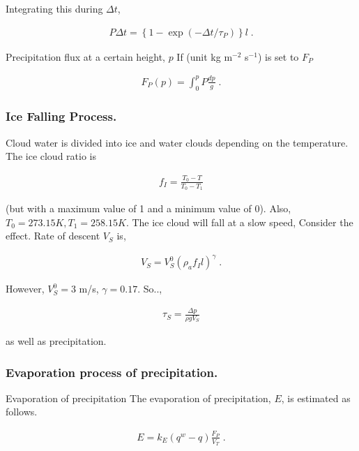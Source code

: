 Integrating this during \(\Delta t\),

\begin{eqnarray}
  P \Delta t  =  \left\{ 1- \exp(- \Delta t/\tau_P) \right\} l \; .
\end{eqnarray}

Precipitation flux at a certain height, \(p\) If (unit kg m\(^{-2}\)
s\(^{-1}\)) is set to \(F_P\)

\begin{eqnarray}
  F_P(p) = \int_0^p P \frac{dp}{g} \; .
\end{eqnarray}

\hypertarget{ice-falling-process.}{%
\subsubsection{Ice Falling Process.}\label{ice-falling-process.}}

Cloud water is divided into ice and water clouds depending on the
temperature. The ice cloud ratio is

\begin{eqnarray}
   f_I = \frac{ T_0 - T }{ T_0 - T_1 }
\end{eqnarray}

(but with a maximum value of 1 and a minimum value of 0). Also,
\(T_0 = 273.15{K}, T_1 = 258.15{K}\). The ice cloud will fall at a slow
speed, Consider the effect. Rate of descent \(V_S\) is,

\begin{eqnarray}
  V_S = V_S^0 ( \rho_a f_I l )^\gamma \; .
\end{eqnarray}

However, \(V_S^0=3\) m/s, \(\gamma=0.17\). So..,

\begin{eqnarray}
  \tau_S = \frac{\Delta p}{\rho g V_S} 
\end{eqnarray}

as well as precipitation.

\hypertarget{evaporation-process-of-precipitation.}{%
\subsubsection{Evaporation process of
precipitation.}\label{evaporation-process-of-precipitation.}}

Evaporation of precipitation The evaporation of precipitation, \(E\), is
estimated as follows.

\begin{eqnarray}
E = k_E (q^w - q) \frac{F_P}{V_T} \; .
\end{eqnarray}

